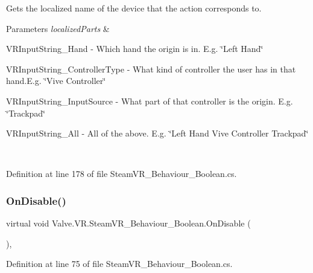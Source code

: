 Gets the localized name of the device that the action corresponds to. 


\begin{DoxyParams}{Parameters}
{\em localized\+Parts} & 
\begin{DoxyItemize}
\item V\+R\+Input\+String\+\_\+\+Hand -\/ Which hand the origin is in. E.\+g. \char`\"{}\+Left Hand\char`\"{} 
\item V\+R\+Input\+String\+\_\+\+Controller\+Type -\/ What kind of controller the user has in that hand.\+E.\+g. \char`\"{}\+Vive Controller\char`\"{} 
\item V\+R\+Input\+String\+\_\+\+Input\+Source -\/ What part of that controller is the origin. E.\+g. \char`\"{}\+Trackpad\char`\"{} 
\item V\+R\+Input\+String\+\_\+\+All -\/ All of the above. E.\+g. \char`\"{}\+Left Hand Vive Controller Trackpad\char`\"{} 
\end{DoxyItemize}\\
\hline
\end{DoxyParams}


Definition at line 178 of file Steam\+V\+R\+\_\+\+Behaviour\+\_\+\+Boolean.\+cs.

\mbox{\label{class_valve_1_1_v_r_1_1_steam_v_r___behaviour___boolean_a3c4c6231615ac96e43cd5646dc515cfd}} 
\subsubsection{\texorpdfstring{OnDisable()}{OnDisable()}}
{\footnotesize\ttfamily virtual void Valve.\+V\+R.\+Steam\+V\+R\+\_\+\+Behaviour\+\_\+\+Boolean.\+On\+Disable (\begin{DoxyParamCaption}{ }\end{DoxyParamCaption})\hspace{0.3cm}{\ttfamily [protected]}, {\ttfamily [virtual]}}



Definition at line 75 of file Steam\+V\+R\+\_\+\+Behaviour\+\_\+\+Boolean.\+cs.

\mbox{\label{class_valve_1_1_v_r_1_1_steam_v_r___behaviour___boolean_ae0bebdd1322463f3cd70b9cdc91ece76}} 

